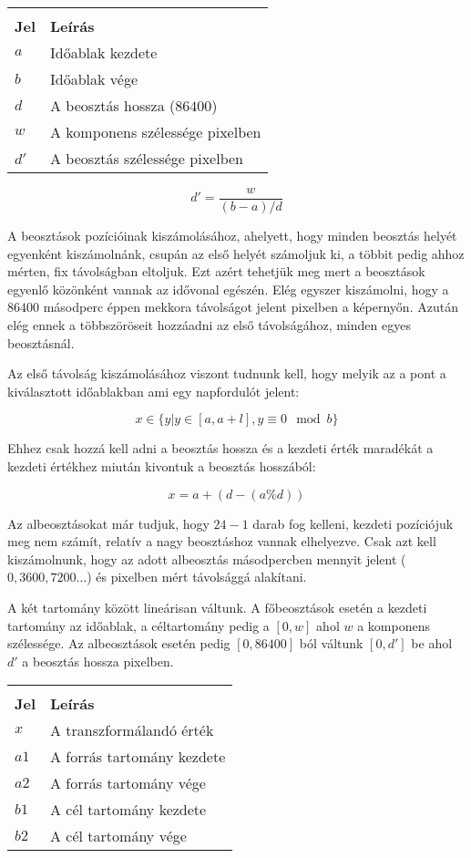 \begin{tabular}{@{}ll@{}}
	& \\
	\textbf{Jel} & \textbf{Leírás} \\
	$a$ & Időablak kezdete \\
	$b$ & Időablak vége \\
	$d$ & A beosztás hossza ($86400$) \\
	$w$ & A komponens szélessége pixelben \\
	$d'$ & A beosztás szélessége pixelben \\
\end{tabular}
$$d' = \frac{w}{(b - a) / d}$$

A beosztások pozícióinak kiszámolásához, ahelyett, hogy minden beosztás helyét egyenként kiszámolnánk, csupán az első helyét számoljuk ki, a többit pedig ahhoz mérten, fix távolságban eltoljuk. Ezt azért tehetjük meg mert a beosztások egyenlő közönként vannak az idővonal egészén. Elég egyszer kiszámolni, hogy a $86400$ másodperc éppen mekkora távolságot jelent pixelben a képernyőn. Azután elég ennek a többszöröseit hozzáadni az első távolságához, minden egyes beosztásnál.

Az első távolság kiszámolásához viszont tudnunk kell, hogy melyik az a pont a kiválasztott időablakban ami egy napfordulót jelent:

$$x \in \{ y | y \in [a, a+l], y \equiv 0 \mod b\}$$

Ehhez csak hozzá kell adni a beosztás hossza és a kezdeti érték maradékát a kezdeti értékhez miután kivontuk a beosztás hosszából:

$$x = a + (d - (a \% d))$$

Az albeosztásokat már tudjuk, hogy $24 - 1$ darab fog kelleni, kezdeti pozíciójuk meg nem számít, relatív a nagy beosztáshoz vannak elhelyezve. Csak azt kell kiszámolnunk, hogy az adott albeosztás másodpercben mennyit jelent ($0, 3600, 7200 \dots $) és pixelben mért távolsággá alakítani.


A két tartomány között lineárisan váltunk. A főbeosztások esetén a kezdeti tartomány az időablak, a céltartomány pedig a $[0, w]$ ahol $w$ a komponens szélessége. Az albeosztások esetén pedig $[0, 86400]$ ból váltunk $[0, d']$ be ahol $d'$ a beosztás hossza pixelben.

\begin{tabular}{@{}ll@{}}
	& \\
	\textbf{Jel} & \textbf{Leírás} \\
	$x$ & A transzformálandó érték \\
	$a1$ & A forrás tartomány kezdete \\
	$a2$ & A forrás tartomány vége \\
	$b1$ & A cél tartomány kezdete \\
	$b2$ & A cél tartomány vége \\
\end{tabular}

